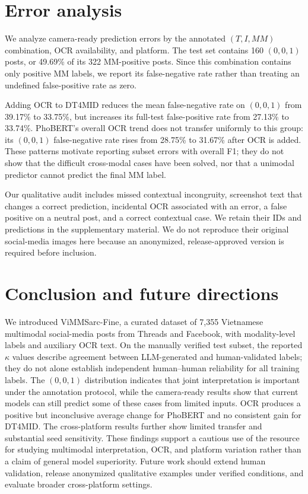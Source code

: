 \documentclass[conference]{IEEEtran}
\begin{document}
\section{Error analysis}
We analyze camera-ready prediction errors by the annotated $(T,I,MM)$ combination, OCR availability, and platform. The test set contains 160 $(0,0,1)$ posts, or 49.69\% of its 322 MM-positive posts. Since this combination contains only positive MM labels, we report its false-negative rate rather than treating an undefined false-positive rate as zero.

Adding OCR to DT4MID reduces the mean false-negative rate on $(0,0,1)$ from 39.17\% to 33.75\%, but increases its full-test false-positive rate from 27.13\% to 33.74\%. PhoBERT's overall OCR trend does not transfer uniformly to this group: its $(0,0,1)$ false-negative rate rises from 28.75\% to 31.67\% after OCR is added. These patterns motivate reporting subset errors with overall F1; they do not show that the difficult cross-modal cases have been solved, nor that a unimodal predictor cannot predict the final MM label.

Our qualitative audit includes missed contextual incongruity, screenshot text that changes a correct prediction, incidental OCR associated with an error, a false positive on a neutral post, and a correct contextual case. We retain their IDs and predictions in the supplementary material. We do not reproduce their original social-media images here because an anonymized, release-approved version is required before inclusion.
\section{Conclusion and future directions}
We introduced ViMMSarc-Fine, a curated dataset of 7{,}355 Vietnamese multimodal social-media posts from Threads and Facebook, with modality-level labels and auxiliary OCR text. On the manually verified test subset, the reported $\kappa$ values describe agreement between LLM-generated and human-validated labels; they do not alone establish independent human--human reliability for all training labels.
The $(0,0,1)$ distribution indicates that joint interpretation is important under the annotation protocol, while the camera-ready results show that current models can still predict some of these cases from limited inputs. OCR produces a positive but inconclusive average change for PhoBERT and no consistent gain for DT4MID. The cross-platform results further show limited transfer and substantial seed sensitivity. These findings support a cautious use of the resource for studying multimodal interpretation, OCR, and platform variation rather than a claim of general model superiority. Future work should extend human validation, release anonymized qualitative examples under verified conditions, and evaluate broader cross-platform settings.
\end{document}
